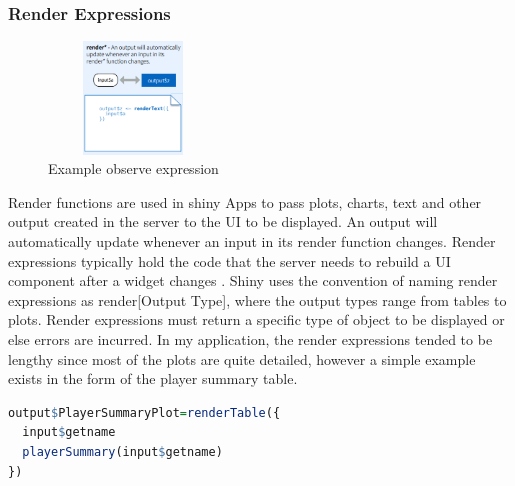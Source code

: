 \subsubsection{Render Expressions}
\begin{figure}
	\vspace{-2em}
	\caption{Example observe expression \cite{shinyCheatSheet}}\label{wrap-fig:2}
	\includegraphics[height=3cm, width=4.5cm]{Images/RenderExpression.png}
\end{figure} 

Render functions are used in shiny Apps to pass plots, charts, text and other output created in the server to the UI to be displayed. An output will automatically update whenever an input in its render function changes. Render expressions typically hold the code that the server needs to rebuild a UI component after a widget changes \cite{shinyCheatSheet}. Shiny uses the convention of naming render expressions as render[Output Type], where the output types range from tables to plots. Render expressions must return a specific type of object to be displayed or else errors are incurred. In my application, the render expressions tended to be lengthy since most of the plots are quite detailed, however a simple example exists in the form of the player summary table.
\begin{lstlisting}[language=R, basicstyle=\small]
output$PlayerSummaryPlot=renderTable({
  input$getname
  playerSummary(input$getname)
})
\end{lstlisting}


